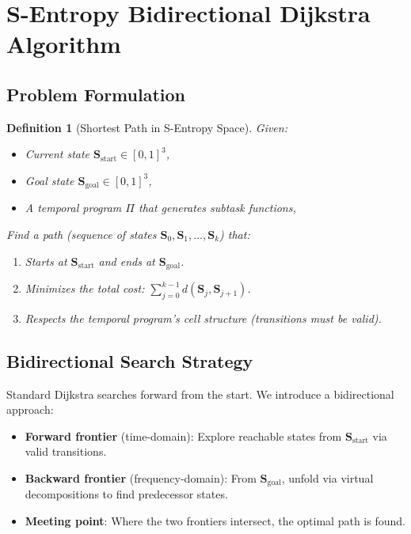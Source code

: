 \documentclass[twocolumn,11pt,a4paper]{article}
\newtheorem{definition}[theorem]{Definition}
\newcommand{\Stuple}{\mathbf{S}}
\begin{document}
\section{S-Entropy Bidirectional Dijkstra Algorithm}
\label{sec:algorithm}

\subsection{Problem Formulation}

\begin{definition}[Shortest Path in S-Entropy Space]
Given:
\begin{itemize}[nosep,leftmargin=1em]
  \item Current state $\Stuple_{\text{start}} \in [0,1]^3$,
  \item Goal state $\Stuple_{\text{goal}} \in [0,1]^3$,
  \item A temporal program $\Pi$ that generates subtask functions,
\end{itemize}
Find a \emph{path} (sequence of states $\Stuple_0, \Stuple_1, \ldots, \Stuple_k$) that:
\begin{enumerate}[nosep,label=(\roman*)]
  \item Starts at $\Stuple_{\text{start}}$ and ends at $\Stuple_{\text{goal}}$.
  \item Minimizes the total cost: $\sum_{j=0}^{k-1} d(\Stuple_j, \Stuple_{j+1})$.
  \item Respects the temporal program's cell structure (transitions must be valid).
\end{enumerate}
\end{definition}

\subsection{Bidirectional Search Strategy}

Standard Dijkstra searches forward from the start. We introduce a bidirectional approach:

\begin{itemize}[nosep,leftmargin=1em]
  \item \textbf{Forward frontier} (time-domain): Explore reachable states from $\Stuple_{\text{start}}$ via valid transitions.
  \item \textbf{Backward frontier} (frequency-domain): From $\Stuple_{\text{goal}}$, unfold via virtual decompositions to find predecessor states.
  \item \textbf{Meeting point}: Where the two frontiers intersect, the optimal path is found.
\end{itemize}
\end{document}
